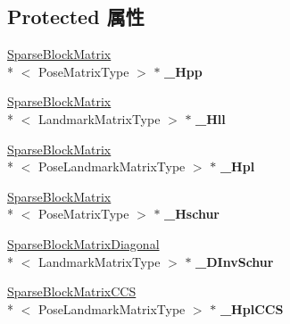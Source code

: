 \subsection*{Protected 属性}
\begin{DoxyCompactItemize}
\item 
\hypertarget{classg2o_1_1BlockSolver_ac222d4342825ed8632a87b4f5be94618}{\hyperlink{classg2o_1_1SparseBlockMatrix}{Sparse\-Block\-Matrix}\\*
$<$ Pose\-Matrix\-Type $>$ $\ast$ {\bfseries \-\_\-\-Hpp}}\label{classg2o_1_1BlockSolver_ac222d4342825ed8632a87b4f5be94618}

\item 
\hypertarget{classg2o_1_1BlockSolver_a88d4c24df24a8fb72be1a4e4cff03d71}{\hyperlink{classg2o_1_1SparseBlockMatrix}{Sparse\-Block\-Matrix}\\*
$<$ Landmark\-Matrix\-Type $>$ $\ast$ {\bfseries \-\_\-\-Hll}}\label{classg2o_1_1BlockSolver_a88d4c24df24a8fb72be1a4e4cff03d71}

\item 
\hypertarget{classg2o_1_1BlockSolver_a0f6051339990e95aa587145a8a6f4f5f}{\hyperlink{classg2o_1_1SparseBlockMatrix}{Sparse\-Block\-Matrix}\\*
$<$ Pose\-Landmark\-Matrix\-Type $>$ $\ast$ {\bfseries \-\_\-\-Hpl}}\label{classg2o_1_1BlockSolver_a0f6051339990e95aa587145a8a6f4f5f}

\item 
\hypertarget{classg2o_1_1BlockSolver_a46977934a3e4fb0cd36bc4181ed3ec0e}{\hyperlink{classg2o_1_1SparseBlockMatrix}{Sparse\-Block\-Matrix}\\*
$<$ Pose\-Matrix\-Type $>$ $\ast$ {\bfseries \-\_\-\-Hschur}}\label{classg2o_1_1BlockSolver_a46977934a3e4fb0cd36bc4181ed3ec0e}

\item 
\hypertarget{classg2o_1_1BlockSolver_ad6a1a8f17c8fb854962a8204c79bc981}{\hyperlink{classg2o_1_1SparseBlockMatrixDiagonal}{Sparse\-Block\-Matrix\-Diagonal}\\*
$<$ Landmark\-Matrix\-Type $>$ $\ast$ {\bfseries \-\_\-\-D\-Inv\-Schur}}\label{classg2o_1_1BlockSolver_ad6a1a8f17c8fb854962a8204c79bc981}

\item 
\hypertarget{classg2o_1_1BlockSolver_ab54eb7bb13f8b3a8a5f135a98f2050ec}{\hyperlink{classg2o_1_1SparseBlockMatrixCCS}{Sparse\-Block\-Matrix\-C\-C\-S}\\*
$<$ Pose\-Landmark\-Matrix\-Type $>$ $\ast$ {\bfseries \-\_\-\-Hpl\-C\-C\-S}}\label{classg2o_1_1BlockSolver_ab54eb7bb13f8b3a8a5f135a98f2050ec}


\end{DoxyCompactItemize}
